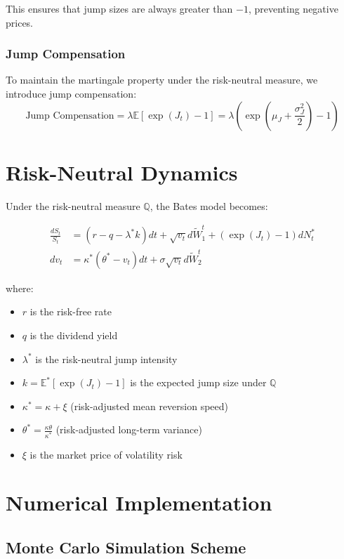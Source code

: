 \documentclass[12pt,a4paper]{article}
\begin{document}
This ensures that jump sizes are always greater than $-1$, preventing negative prices.

\subsubsection{Jump Compensation}
To maintain the martingale property under the risk-neutral measure, we introduce jump compensation:
\begin{equation}
\text{Jump Compensation} = \lambda \mathbb{E}[\exp(J_t) - 1] = \lambda(\exp(\mu_J + \frac{\sigma_J^2}{2}) - 1)
\end{equation}

\section{Risk-Neutral Dynamics}

Under the risk-neutral measure $\mathbb{Q}$, the Bates model becomes:

\begin{align}
\frac{dS_t}{S_t} &= (r - q - \lambda^*k) dt + \sqrt{v_t} d\tilde{W}_1^t + (\exp(J_t) - 1) dN_t^* \\
dv_t &= \kappa^*(\theta^* - v_t)dt + \sigma\sqrt{v_t} d\tilde{W}_2^t
\end{align}

where:
\begin{itemize}
    \item $r$ is the risk-free rate
    \item $q$ is the dividend yield
    \item $\lambda^*$ is the risk-neutral jump intensity
    \item $k = \mathbb{E}^*[\exp(J_t) - 1]$ is the expected jump size under $\mathbb{Q}$
    \item $\kappa^* = \kappa + \xi$ (risk-adjusted mean reversion speed)
    \item $\theta^* = \frac{\kappa\theta}{\kappa^*}$ (risk-adjusted long-term variance)
    \item $\xi$ is the market price of volatility risk
\end{itemize}

\section{Numerical Implementation}

\subsection{Monte Carlo Simulation Scheme}
\end{document}
